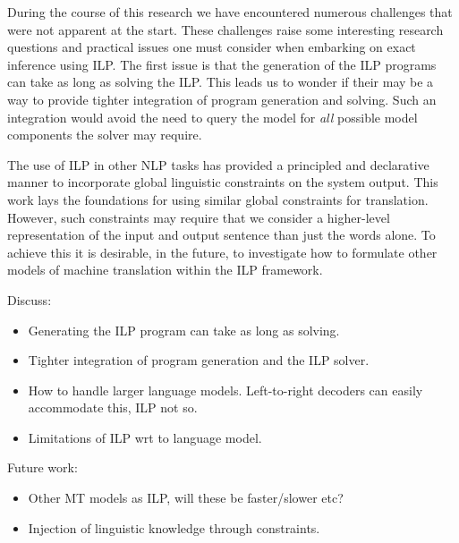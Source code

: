 During the course of this research we have encountered numerous
challenges that were not apparent at the start.  These challenges
raise some interesting research questions and practical issues one
must consider when embarking on exact inference using ILP.  The first
issue is that the generation of the ILP programs can take as long as
solving the ILP.  This leads us to wonder if their may be a way to
provide tighter integration of program generation and solving.  Such
an integration would avoid the need to query the model for \emph{all}
possible model components the solver may require.  

The use of ILP in other NLP tasks has provided a principled and
declarative manner to incorporate global linguistic constraints on the
system output.  This work lays the foundations for using similar
global constraints for translation.  However, such constraints may
require that we consider a higher-level representation of the input
and output sentence than just the words alone.  To achieve this it is
desirable, in the future, to investigate how to formulate other models
of machine translation within the ILP framework.

Discuss:
\begin{itemize}
\item Generating the ILP program can take as long as solving.
\item Tighter integration of program generation and the ILP solver.
\item How to handle larger language models.  Left-to-right decoders
  can easily accommodate this, ILP not so.
\item Limitations of ILP wrt to language model.
\end{itemize}

Future work:
\begin{itemize}
\item Other MT models as ILP, will these be faster/slower etc?
\item Injection of linguistic knowledge through constraints.
\end{itemize}

